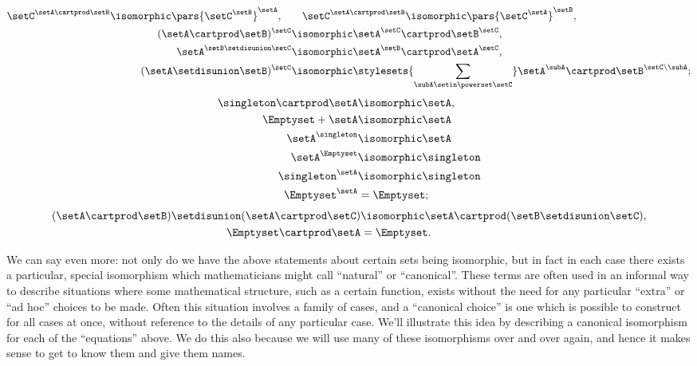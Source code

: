 \begin{align}\label{eq:arithmetic-with-sets-2}
    \setC^{\setA \cartprod \setB} \isomorphic \pars{\setC^\setB}^\setA, \quad & \quad    \setC^{\setA \cartprod \setB} \isomorphic \pars{\setC^\setA}^\setB, \\
    (\setA \cartprod \setB)^{\setC}                                           & \isomorphic  \setA^\setC \cartprod \setB^\setC, \\
    \setA^{\setB \setdisunion \setC}                                          & \isomorphic \setA^\setB \cartprod \setA^\setC, \\
    (\setA \setdisunion \setB)^{\setC}                                        & \isomorphic \stylesets{\sum_{\subA \setin \powerset \setC}} \setA^\subA \cartprod \setB^{\setC \backslash \subA};
\end{align}
\begin{align}\label{eq:arithmetic-with-sets-3}
    \singleton \cartprod \setA & \isomorphic \setA, \\
    \Emptyset + \setA          & \isomorphic \setA \\
    \setA^\singleton           & \isomorphic \setA \\
    \setA^\Emptyset            & \isomorphic \singleton \\
    \singleton^\setA           & \isomorphic \singleton \\
    \Emptyset^\setA            & = \Emptyset;
\end{align}
\begin{align}\label{eq:arithmetic-with-sets-4}
    (\setA \cartprod \setB) \setdisunion (\setA \cartprod \setC) & \isomorphic \setA \cartprod (\setB \setdisunion \setC), \\
    \Emptyset \cartprod \setA                                    & = \Emptyset.
\end{align}


We can say even more: not only do we have the above statements about certain sets being isomorphic, but in fact in each case there exists a particular, special isomorphism which mathematicians might call ``natural'' or ``canonical''.
These terms are often used in an informal way to describe situations where some mathematical structure, such as a certain function, exists without the need for any particular ``extra'' or ``ad hoc'' choices to be made.
Often this situation involves a family of cases, and a ``canonical choice'' is one which is possible to construct for all cases at once, without reference to the details of any particular case.
We'll illustrate this idea by describing a canonical isomorphism for each of the ``equations'' above.
We do this also because we will use many of these isomorphisms over and over again, and hence it makes sense to get to know them and give them names.

